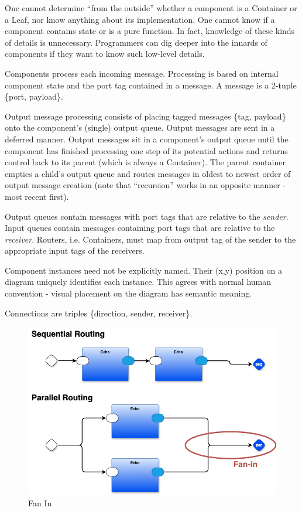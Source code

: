 \documentclass[10pt,anonymous,review]{acmart}
\begin{document}
One cannot determine “from the outside” whether a component is a Container or a Leaf, nor know anything about its implementation. One cannot know if a component contains state or is a pure function. In fact, knowledge of these kinds of details is unnecessary. Programmers can dig deeper into the innards of components if they want to know such low-level details.

Components process each incoming message. Processing is based on internal component state and the port tag contained in a message. A message is a 2-tuple \{port, payload\}.

Output message processing consists of placing tagged messages \{tag, payload\} onto the component’s (single) output queue. Output messages are sent in a deferred manner. Output messages sit in a component’s output queue until the component has finished processing one step of its potential actions and returns control back to its parent (which is always a Container). The parent container empties a child’s output queue and routes messages in oldest to newest order of output message creation (note that “recursion” works in an opposite manner - most recent first).

Output queues contain messages with port tags that are relative to the \emph{sender}. Input queues contain messages containing port tags that are relative to the \emph{receiver}. Routers, i.e. Containers, must map from output tag of the sender to the appropriate input tags of the receivers.

Component instances need not be explicitly named. Their (x,y) position on a diagram uniquely identifies each instance. This agrees with normal human convention - visual placement on the diagram has semantic meaning.


Connections are triples \{direction, sender, receiver\}.


  \begin{figure}
    \includegraphics[scale=0.2]{./media/fanin.png}
    \caption{Fan In}
    \label{fanin}
  \end{figure}
\end{document}
